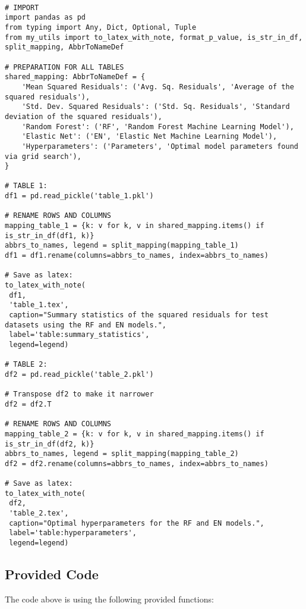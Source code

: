 \documentclass[11pt]{article}
\begin{document}
\begin{verbatim}

# IMPORT
import pandas as pd
from typing import Any, Dict, Optional, Tuple
from my_utils import to_latex_with_note, format_p_value, is_str_in_df, split_mapping, AbbrToNameDef

# PREPARATION FOR ALL TABLES
shared_mapping: AbbrToNameDef = {
    'Mean Squared Residuals': ('Avg. Sq. Residuals', 'Average of the squared residuals'),
    'Std. Dev. Squared Residuals': ('Std. Sq. Residuals', 'Standard deviation of the squared residuals'),
    'Random Forest': ('RF', 'Random Forest Machine Learning Model'),
    'Elastic Net': ('EN', 'Elastic Net Machine Learning Model'),
    'Hyperparameters': ('Parameters', 'Optimal model parameters found via grid search'),
}

# TABLE 1:
df1 = pd.read_pickle('table_1.pkl')

# RENAME ROWS AND COLUMNS 
mapping_table_1 = {k: v for k, v in shared_mapping.items() if is_str_in_df(df1, k)} 
abbrs_to_names, legend = split_mapping(mapping_table_1)
df1 = df1.rename(columns=abbrs_to_names, index=abbrs_to_names)

# Save as latex:
to_latex_with_note(
 df1, 
 'table_1.tex',
 caption="Summary statistics of the squared residuals for test datasets using the RF and EN models.", 
 label='table:summary_statistics',
 legend=legend)

# TABLE 2:
df2 = pd.read_pickle('table_2.pkl')

# Transpose df2 to make it narrower
df2 = df2.T

# RENAME ROWS AND COLUMNS 
mapping_table_2 = {k: v for k, v in shared_mapping.items() if is_str_in_df(df2, k)}
abbrs_to_names, legend = split_mapping(mapping_table_2)
df2 = df2.rename(columns=abbrs_to_names, index=abbrs_to_names)

# Save as latex:
to_latex_with_note(
 df2, 
 'table_2.tex',
 caption="Optimal hyperparameters for the RF and EN models.", 
 label='table:hyperparameters',
 legend=legend)

\end{verbatim}

\subsection{Provided Code}
The code above is using the following provided functions:
\end{document}
